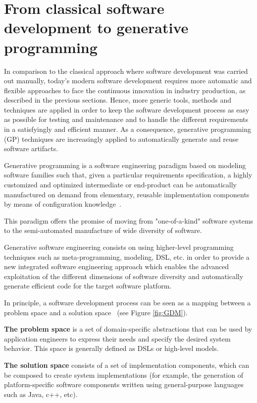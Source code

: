 \section{From classical software development to generative programming}
\label{sec:FROM} 
In comparison to the classical approach where software development was carried out manually, today’s modern software development requires more automatic and flexible approaches to face the continuous innovation in industry production, as described in the previous sections.
Hence, more generic tools, methods and techniques are applied in order to keep the software development process as easy as possible for testing and maintenance and to handle the different requirements in a satisfyingly and efficient manner.
As a consequence, generative programming (GP) techniques are increasingly applied to automatically generate and reuse software artifacts.
\begin{mydef}
		Generative programming is a software engineering paradigm based on modeling software families such that, given a particular requirements specification, a highly customized and optimized intermediate or end-product can be automatically manufactured on demand from elementary, reusable implementation components by means of configuration knowledge~\cite{Czarnecki:2000:GPM:345203}.
\end{mydef}

This paradigm offers the promise of moving from "one-of-a-kind" software systems to the semi-automated manufacture of wide diversity of software.

Generative software engineering consists on using higher-level programming techniques such as meta-programming, modeling, DSL, etc. in order to provide a new integrated software engineering approach which enables the advanced exploitation of the different dimensions of software diversity and automatically generate efficient code for the target software platform. 

In principle, a software development process can be seen as a mapping between a problem space and a solution space~\cite{czarnecki2005overview} (see Figure \ref{fig:GDM}). 

\textbf{The problem space} is a set of domain-specific abstractions that can be used by application engineers to express their needs and specify the desired system behavior. This space is generally defined  as DSLs or high-level models. 

\textbf{The solution space} consists of a set of implementation components, which can be composed to create system implementations (for example, the generation of platform-specific software components written using general-purpose languages such as Java, c++, etc).

